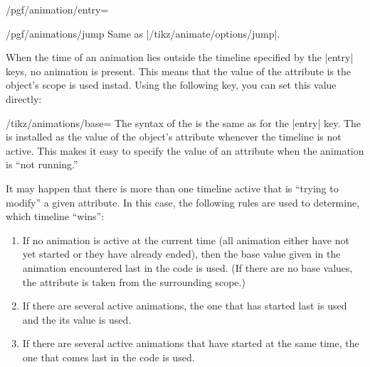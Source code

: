 \begin{key}{/pgf/animation/entry=}
  \begin{key}{/pgf/animations/jump}
    Same as |/tikz/animate/options/jump|.

\begin{codeexample}[animation list={0.5,1,1.5,2}]
\end{codeexample}
  \end{key}

\end{key}


When the time of an animation lies outside the timeline specified by
the |entry| keys, no animation is present. This means that the
value of the attribute is the object's scope is used instad. Using the
following key, you can set this value directly:

\begin{key}{/tikz/animations/base=}
  The syntax of the  is the same as for the |entry|
  key. The  is installed as the value of the object's
  attribute whenever the timeline is not active. This makes it easy to
  specify the value of an attribute when the animation is ``not
  running.'' 

\begin{codeexample}[animation list={-1,0,1,2,3}]
\end{codeexample}
\end{key}


It may happen that there is more than one timeline active that is
``trying to modify'' a given attribute. In this case, the following
rules are used to determine, which timeline ``wins'':

\begin{enumerate}
\item If no animation is active at the current time (all animation
  either have not yet started or they have already ended), then the
  base value given in the animation encountered last in the code is
  used. (If there are no base values, the attribute is taken from the
  surrounding scope.)
\item If there are several active animations, the one that has started
  last is used and the its value is used.
\item If there are several active animations that have started at the
  same time, the one that comes last in the code is used.
\end{enumerate}

